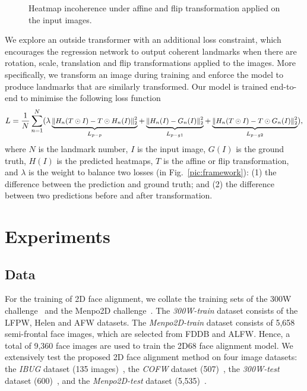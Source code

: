 \documentclass{bmvc2k}
\begin{document}
\begin{figure*}[h!]
\centering
{}
\caption{Heatmap incoherence under affine and flip transformation applied on the input images.}
\vspace{-4mm}
\label{fig:loss}
\end{figure*}

We explore an outside transformer with an additional loss constraint, which encourages the regression network to output coherent landmarks when there are rotation, scale, translation and flip transformations applied to the images. More specifically, we transform an image during training and enforce the model to produce landmarks that are similarly transformed. Our model is trained end-to-end to minimise the following loss function
\begin{equation}
\small
L = \frac{1}{N} \sum_{n=1}^{N} (\lambda \underbrace{\| H_n(T \odot I) - T \odot H_n(I) \|_{2}^{2}}_{L_{p-p}} + \underbrace{\| H_n(I)-G_n(I)\|_{2}^{2}}_{L_{p-g1}}+ \underbrace{\| H_n(T \odot I) - T \odot G_n(I)\|_{2}^{2}}_{L_{p-g2}}),  
\label{eq:loss}
\vspace{-2mm}
\end{equation}
where $N$ is the landmark number, $I$ is the input image, $G(I)$ is the ground truth, $H(I)$ is the predicted heatmaps, $T$ is the affine or flip transformation, and $\lambda$ is the weight to balance two losses (in Fig.~\ref{pic:framework}): (1) the difference between the prediction and ground truth; and (2) the difference between two predictions before and after transformation.





\section{Experiments}

\subsection{Data}



For the training of 2D face alignment, we collate the training sets of the 300W challenge~\cite{sagonas2016300} and the Menpo2D challenge~\cite{stefanos2017menpo}. The {\em 300W-train} dataset consists of the LFPW, Helen and AFW datasets. The {\em Menpo2D-train} dataset consists of 5,658 semi-frontal face images, which are selected from FDDB and ALFW.
Hence, a total of 9,360 face images are used to train the 2D68 face alignment model.
We extensively test the proposed 2D face alignment method on four image datasets: 
the {\em IBUG} dataset (135 images)~\cite{sagonas2016300}, the {\em COFW} dataset (507)~\cite{burgos2013robust,ghiasi2015occlusion}, the {\em 300W-test} dataset (600)~\cite{sagonas2016300}, and the {\em Menpo2D-test} dataset (5,535)~\cite{stefanos2017menpo}.
\end{document}
